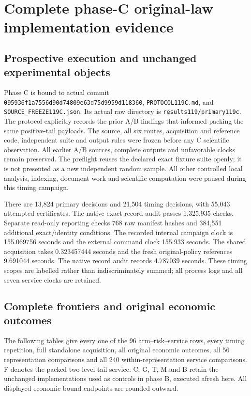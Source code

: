 \section{Complete phase-C original-law implementation evidence}
\label{sec:development119c}

\subsection{Prospective execution and unchanged experimental objects}
Phase C is bound to actual commit
\nolinkurl{095936f1a7556d90d74809e63d75d9959d118360},
\nolinkurl{PROTOCOL119C.md}, and \nolinkurl{SOURCE_FREEZE119C.json}.
Its actual raw directory is \nolinkurl{results119/primary119c}.  The
protocol explicitly records the prior A/B findings that informed
packing the same positive-tail payloads.  The source, all six routes,
acquisition and reference code, independent suite and output rules
were frozen before any C scientific observation.  All earlier A/B
sources, complete outputs and unfavorable clocks remain preserved.
The preflight reuses the declared exact fixture suite openly; it is
not presented as a new independent random sample.  All other controlled
local analysis, indexing, document work and scientific computation were
paused during this timing campaign.

There are 13,824 primary decisions and 21,504 timing decisions, with
55,043 attempted certificates.  The native exact record audit passes
1,325,935 checks.  Separate read-only reporting checks 768 raw manifest
hashes and 384,551 additional exact/identity conditions.  The recorded
internal campaign clock is 155.069756 seconds and the external command
clock 155.933 seconds.  The shared acquisition takes 0.323457444 seconds
and the fresh original-policy references 9.691044 seconds.  The native
record audit records 4.787039 seconds.  These timing scopes are labelled
rather than indiscriminately summed; all process logs and all seven
service clocks are retained.

\subsection{Complete frontiers and original economic outcomes}
The following tables give every one of the 96 arm--risk--service rows,
every timing repetition, full standalone acquisition, all original
economic outcomes, all 56 representation comparisons and all 240
within-representation service comparisons.  F denotes the packed
two-level tail service.  C, G, T, M and B retain the unchanged
implementations used as controls in phase B, executed afresh here.
All displayed economic bound endpoints are rounded outward.

